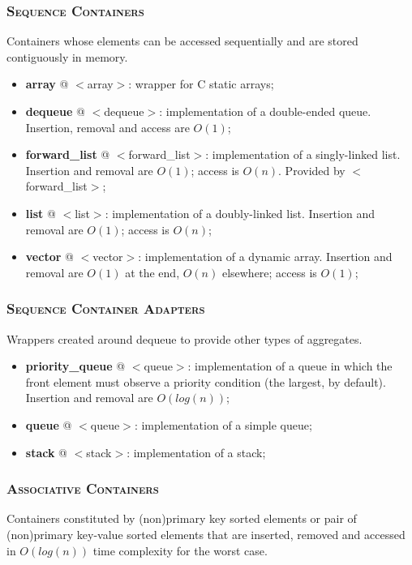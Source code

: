 \documentclass[10pt]{article}
\begin{document}
\begin{multicols*}{5}
{\subsubsection*{\textsc{Sequence Containers}} 
\noindent
Containers whose elements can be accessed sequentially and are stored contiguously in memory.

\begin{itemize}[leftmargin=*,topsep=0.25pt]
  \setlength\itemsep{-1.8pt}
	\item \textbf{array} @ $<$array$>$: wrapper for C static arrays;
	\item \textbf{dequeue} @ $<$dequeue$>$: implementation of a double-ended queue. Insertion, removal and access are $O(1)$;
	\item \textbf{forward\_list} @ $<$forward\_list$>$: implementation of a singly-linked list. Insertion and removal are $O(1)$; access is $O(n)$. Provided by $<$forward\_list$>$;  
	\item \textbf{list} @ $<$list$>$: implementation of a doubly-linked list. Insertion and removal are $O(1)$; access is $O(n)$;
	\item \textbf{vector} @ $<$vector$>$: implementation of a dynamic array. Insertion and removal are $O(1)$ at the end, $O(n)$ elsewhere; access is $O(1)$;
\end{itemize}

\subsubsection*{\textsc{Sequence Container Adapters}} 
\noindent
Wrappers created around dequeue to provide other types of aggregates.

\begin{itemize}[leftmargin=*,topsep=0.25pt]
  \setlength\itemsep{-1.8pt}
	\item \textbf{priority\_queue} @ $<$queue$>$: implementation of a queue in which the front element must observe a priority condition (the largest, by default). Insertion and removal are $O(log(n))$;
	\item \textbf{queue} @ $<$queue$>$: implementation of a simple queue;
	\item \textbf{stack} @ $<$stack$>$: implementation of a stack;
\end{itemize}
\noindent

\subsubsection*{\textsc{Associative Containers}} 
\noindent
Containers constituted by (non)primary key sorted elements or pair of (non)primary key-value sorted elements that are  inserted, removed and accessed in $O(log(n))$ time complexity for the worst case.

}
\end{multicols*}
\end{document}
